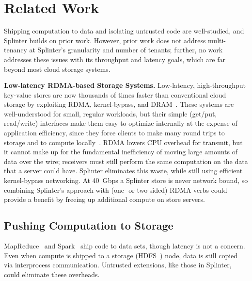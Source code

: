\section{Related Work}
\label{sec:related}

Shipping computation to data and isolating untrusted code are well-studied, and
Splinter builds on prior work.
However, prior work does not address multi-tenancy at Splinter's granularity and
number of tenants; further, no work addresses
these issues with its throughput and latency goals, which are far
beyond most cloud storage systems.

\textbf{Low-latency RDMA-based Storage Systems.}
%
Low-latency, high-throughput key-value stores are now thousands of times faster
  than conventional cloud storage by exploiting RDMA, kernel-bypass, and
  DRAM~\cite{farm-2014,farm-txns,herd,billions,mica,ramcloud}.
These systems are well-understood for small, regular workloads, but their
  simple (get/put, read/write) interfaces make them easy to optimize internally
  at the expense of application efficiency, since they
  force clients to make many round trips to storage and to compute locally~\cite{deb-farm}.
%
RDMA lowers CPU overhead for transmit, but it cannot make up for the
  fundamental inefficiency of moving large amounts of data over the wire;
  receivers must still perform the same computation
  on the data that a server could have.
Splinter eliminates this waste, while still using efficient kernel-bypass networking.
%
At 40~Gbps a Splinter store is never network bound, so combining Splinter's
  approach with (one- or two-sided) RDMA verbs could provide a benefit by freeing up
  additional compute on store servers.

\subsection{Pushing Computation to Storage}

MapReduce~\cite{mapreduce} and Spark~\cite{spark} ship code to data
sets, though latency is not a concern.  Even when compute is shipped to a storage
(HDFS~\cite{hdfs}) node, data is still copied via interprocess
communication.  Untrusted extensions, like those in Splinter, could
eliminate these overheads.


